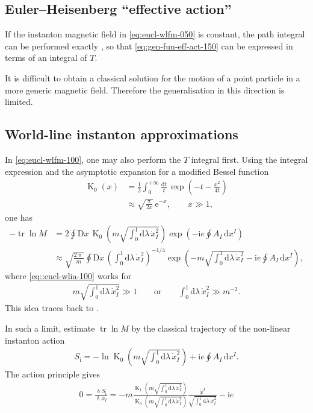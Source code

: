\documentclass[12pt]{article}
\newcommand\mi{\mathrm{i}} %
\newcommand\me{\mathrm{e}} %
\newcommand\pp{\uppi}
\newcommand\dif{\mathrm{d}}
\newcommand\Dif{\mathrm{D}}
\newcommand\dva{\updelta}
\DeclareMathOperator{\BesselK}{K}
\DeclareMathOperator{\tr}{tr}
\newcommand{\rbr}[1]{{\left(#1\right)}}
\newcommand{\rfun}[2]{{#1}\mathopen{}\left(#2\right)\mathclose{}}
\newcommand{\frdva}[2]{{\frac{\dva{#1}}{\dva{#2}}}}
\begin{document}
\subsection{Euler--Heisenberg ``effective action''}
\label{ssec:eucl-ehel}

If the instanton magnetic field in \cref{eq:eucl-wlfm-050} is constant, the 
path integral can be performed exactly \cite{Feynman1965}, so that 
\cref{eq:gen-fun-eff-act-150} can be expressed in terms of an integral of $T$.

It is difficult to obtain a classical solution for the motion of a point 
particle in a more generic magnetic field. %
Therefore the generalisation in this direction is limited.

\subsection{World-line instanton approximations}
\label{ssec:eucl-wlia}

In \cref{eq:eucl-wlfm-100}, one may also perform the $T$ integral first. Using 
the integral expression and the asymptotic expansion for a modified Bessel 
function
\begin{align}
\rfun{\BesselK_0}{x} &= \frac{1}{2} \int_0^{+\infty} \frac{\dif t}{t}\,
	\rfun{\exp}{-t-\frac{x^2}{4t}}
\\
&\approx \sqrt{\frac{\pp}{2x}}\,\me^{-x},\qquad
	x \gg 1,
\end{align}
one has
\begin{align}
- \tr\ln M &= 2 \oint \Dif x\,
	\rfun{\BesselK_0}{m\sqrt{\int_0^1 \dif\lambda\, \dot{x}_I^2}}
		\rfun{\exp}{- \mi e \oint A_I\,\dif x^I}
\\
&\approx \sqrt{\frac{2\pp}{m}} \oint \Dif x\,
	\rbr{\int_0^1 \dif\lambda\, \dot{x}_I^2}^{-1/4}
	\rfun{\exp}{-m\sqrt{\int_0^1 \dif\lambda\, \dot{x}_I^2}
		- \mi e \oint A_I\,\dif x^I},
\label{eq::eucl-wlia-100}
\end{align}
where \cref{eq::eucl-wlia-100} works for
\begin{align}
m \sqrt{\int_0^1 \dif\lambda\, \dot{x}_I^2} \gg 1
\qquad\text{or}\qquad
\int_0^1 \dif\lambda\, \dot{x}_I^2 \gg m^{-2}.
\end{align}
This idea traces back to \cite{Affleck1982}.

In such a limit, estimate $\tr\ln M$ by the classical trajectory of the 
non-linear instanton action
\begin{align}
S_\text{i} = -\ln\rfun{\BesselK_0}{m\sqrt{\int_0^1\dif\lambda\, \dot{x}_I^2}}
+ \mi e \oint A_I\,\dif x^I.
\end{align}
The action principle gives
\begin{align}
0 = \frdva{S_\text{i}}{x_I} = -m 
\frac{\rfun{\BesselK_1}{m\sqrt{\int_0^1\dif\lambda\, \dot{x}_I^2}}}%
{\rfun{\BesselK_0}{m\sqrt{\int_0^1\dif\lambda\, \dot{x}_I^2}}}
\frac{\ddot{x}^I}{\sqrt{\int_0^1\dif\lambda\, \dot{x}_I^2}} - \mi e
\end{align}
\end{document}
